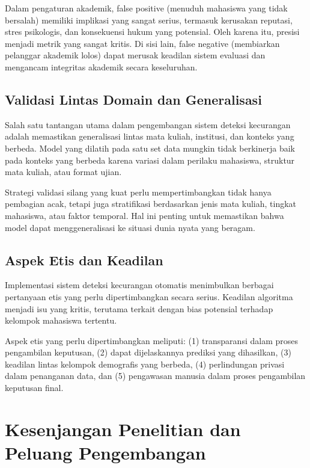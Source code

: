 Dalam pengaturan akademik, false positive (menuduh mahasiswa yang tidak bersalah) memiliki implikasi yang sangat serius, termasuk kerusakan reputasi, stres psikologis, dan konsekuensi hukum yang potensial. Oleh karena itu, presisi menjadi metrik yang sangat kritis. Di sisi lain, false negative (membiarkan pelanggar akademik lolos) dapat merusak keadilan sistem evaluasi dan mengancam integritas akademik secara keseluruhan.

\subsection{Validasi Lintas Domain dan Generalisasi}

Salah satu tantangan utama dalam pengembangan sistem deteksi kecurangan adalah memastikan generalisasi lintas mata kuliah, institusi, dan konteks yang berbeda. Model yang dilatih pada satu set data mungkin tidak berkinerja baik pada konteks yang berbeda karena variasi dalam perilaku mahasiswa, struktur mata kuliah, atau format ujian.

Strategi validasi silang yang kuat perlu mempertimbangkan tidak hanya pembagian acak, tetapi juga stratifikasi berdasarkan jenis mata kuliah, tingkat mahasiswa, atau faktor temporal. Hal ini penting untuk memastikan bahwa model dapat menggeneralisasi ke situasi dunia nyata yang beragam.

\subsection{Aspek Etis dan Keadilan}

Implementasi sistem deteksi kecurangan otomatis menimbulkan berbagai pertanyaan etis yang perlu dipertimbangkan secara serius. Keadilan algoritma menjadi isu yang kritis, terutama terkait dengan bias potensial terhadap kelompok mahasiswa tertentu.

Aspek etis yang perlu dipertimbangkan meliputi: (1) transparansi dalam proses pengambilan keputusan, (2) dapat dijelaskannya prediksi yang dihasilkan, (3) keadilan lintas kelompok demografis yang berbeda, (4) perlindungan privasi dalam penanganan data, dan (5) pengawasan manusia dalam proses pengambilan keputusan final.

\section{Kesenjangan Penelitian dan Peluang Pengembangan}
\label{sec:researchGaps}

